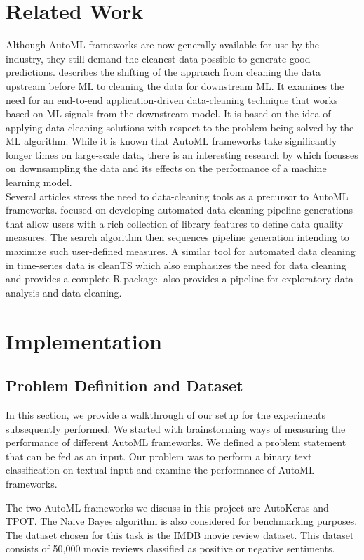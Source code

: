 \documentclass{article}
\begin{document}
\section{Related Work}
Although AutoML frameworks are now generally available for use by the industry, they still demand the cleanest data possible to generate good predictions. \cite{literature1} describes the shifting of the approach from cleaning the data upstream before ML to cleaning the data for downstream ML. It examines the need for an end-to-end application-driven data-cleaning technique that works based on ML signals from the downstream model. It is based on the idea of applying data-cleaning solutions with respect to the problem being solved by the ML algorithm. While it is known that AutoML frameworks take significantly longer times on large-scale data, there is an interesting research by \cite{downsampling} which focusses on downsampling the data and its effects on the performance of a machine learning model.  \\
Several articles stress the need to data-cleaning tools as a precursor to AutoML frameworks. \cite{alphaclean} focused on developing automated data-cleaning pipeline generations that allow users with a rich collection of library features to define data quality measures. The search algorithm then sequences pipeline generation intending to maximize such user-defined measures. A similar tool for automated data cleaning in time-series data is cleanTS \cite{cleants} which also emphasizes the need for data cleaning and provides a complete R package. \cite{dataassist} also provides a pipeline for exploratory data analysis and data cleaning. 

\section{Implementation}

\subsection{Problem Definition and Dataset}
In this section, we provide a walkthrough of our setup for the experiments subsequently performed. We started with brainstorming ways of measuring the performance of different AutoML frameworks. We defined a problem statement that can be fed as an input. Our problem was to perform a binary text classification on textual input and examine the performance of AutoML frameworks. 

The two AutoML frameworks we discuss in this project are AutoKeras and TPOT. The Naive Bayes algorithm is also considered for benchmarking purposes. The dataset chosen for this task is the IMDB movie review \cite{imdbdata}  dataset. This dataset consists of 50,000 movie reviews classified as positive or negative sentiments.
\end{document}
